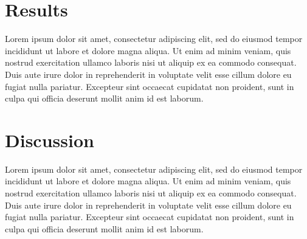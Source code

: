 \documentclass[letterpaper]{article}
\begin{document}
\section{Results}
Lorem ipsum dolor sit amet, consectetur adipiscing elit, sed do eiusmod tempor incididunt ut labore et dolore magna aliqua. Ut enim ad minim veniam, quis nostrud exercitation ullamco laboris nisi ut aliquip ex ea commodo consequat. Duis aute irure dolor in reprehenderit in voluptate velit esse cillum dolore eu fugiat nulla pariatur. Excepteur sint occaecat cupidatat non proident, sunt in culpa qui officia deserunt mollit anim id est laborum.

\section{Discussion}
Lorem ipsum dolor sit amet, consectetur adipiscing elit, sed do eiusmod tempor incididunt ut labore et dolore magna aliqua. Ut enim ad minim veniam, quis nostrud exercitation ullamco laboris nisi ut aliquip ex ea commodo consequat. Duis aute irure dolor in reprehenderit in voluptate velit esse cillum dolore eu fugiat nulla pariatur. Excepteur sint occaecat cupidatat non proident, sunt in culpa qui officia deserunt mollit anim id est laborum.

\newpage



\end{document}
